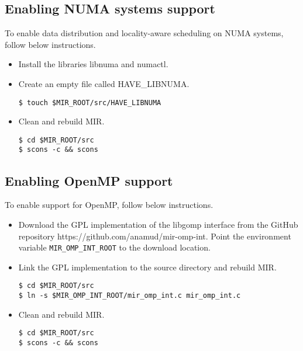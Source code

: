 \documentclass[11pt,a4paper]{article}
\begin{document}
\subsection{Enabling NUMA systems support}\label{sec:enabling-numa-systems-support}

To enable data distribution and locality-aware scheduling on NUMA systems, follow below instructions.

\begin{itemize}
    \item Install the libraries \textsf{libnuma} and \textsf{numactl}.
    \item Create an empty file called \textsf{HAVE\_LIBNUMA}.

\begin{lstlisting}[style=MyInputStyle]
$ touch $MIR_ROOT/src/HAVE_LIBNUMA
\end{lstlisting}

    \item Clean and rebuild MIR.

\begin{lstlisting}[style=MyInputStyle]
$ cd $MIR_ROOT/src
$ scons -c && scons
\end{lstlisting}
\end{itemize}

\subsection{Enabling OpenMP support}\label{sec:enable-omp-support}

To enable support for OpenMP, follow below instructions.

\begin{itemize}
    \item Download the GPL implementation of the libgomp interface from the GitHub repository \textsf{https://github.com/anamud/mir-omp-int}.  Point the environment variable \texttt{MIR\_OMP\_INT\_ROOT} to the download location.

    \item Link the GPL implementation to the source directory and rebuild MIR.

\begin{lstlisting}[style=MyInputStyle]
$ cd $MIR_ROOT/src
$ ln -s $MIR_OMP_INT_ROOT/mir_omp_int.c mir_omp_int.c
\end{lstlisting}

    \item Clean and rebuild MIR.

\begin{lstlisting}[style=MyInputStyle]
$ cd $MIR_ROOT/src
$ scons -c && scons
\end{lstlisting}
\end{itemize}
\end{document}

